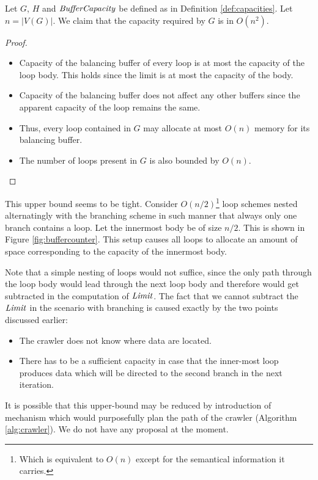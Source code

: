   Let $G$, $H$ and $\mf{bufferCapacity}$ be defined as in Definition \ref{def:capacities}. Let $n=| V(G) |$. We claim that the capacity required by $G$ is in $O(n^2)$. 
  \begin{proof}\ 
    \begin{itemize}
      \item Capacity of the balancing buffer of every loop is at most the capacity of the loop body. This holds since the limit is at most the capacity of the body.
      \item Capacity of the balancing buffer does not affect any other buffers since the apparent capacity of the loop remains the same.
      \item Thus, every loop contained in $G$ may allocate at most $O(n)$ memory for its balancing buffer.
      \item The number of loops present in $G$ is also bounded by $O(n)$.
    \end{itemize}
  \end{proof}
\myendclaim

This upper bound seems to be tight. Consider $O(n/2)$\footnote{Which is equivalent to $O(n)$ except for the semantical information it carries.} loop schemes nested alternatingly with the branching scheme in such manner that always only one branch contains a loop. Let the innermost body be of size $n/2$. This is shown in Figure \ref{fig:buffercounter}. This setup causes all loops to allocate an amount of space corresponding to the capacity of the innermost body.


Note that a simple nesting of loops would not suffice, since the only path through the loop body would lead through the next loop body and therefore would get subtracted in the computation of $\mf{limit}$. The fact that we cannot subtract the $\mf{limit}$ in the scenario with branching is caused exactly by the two points discussed earlier:
\begin{itemize}
  \item The crawler does not know where data are located.
  \item There has to be a sufficient capacity in case that the inner-most loop produces data which will be directed to the second branch in the next iteration. 
\end{itemize}

It is possible that this upper-bound may be reduced by introduction of mechanism which would purposefully plan the path of the crawler (Algorithm \ref{alg:crawler}). We do not have any proposal at the moment.
  
